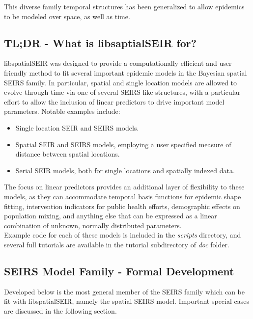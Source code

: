 \documentclass[12pt]{article}
\begin{document}
This diverse family temporal structures has been generalized to allow epidemics to be modeled over space, as well as time.  

\subsection{TL;DR - What is libsaptialSEIR for?}

libspatialSEIR was designed to provide a computationally efficient and user friendly method to fit several important epidemic 
models in the Bayesian spatial SEIRS family. In particular, spatial and single location models are allowed to evolve through 
time via one of several SEIRS-like structures, with a particular effort to allow the inclusion of linear predictors to drive
important model parameters. Notable examples include:

\begin{itemize}
    \item Single location SEIR and SEIRS models.   
    \item Spatial SEIR and SEIRS models, employing a user specified measure of distance between spatial locations. 
    \item Serial SEIR models, both for single locations and spatially indexed data. 
\end{itemize}

The focus on linear predictors provides an additional layer of flexibility to these models, as they can accommodate 
temporal basis functions for epidemic shape fitting, intervention indicators for public health efforts, demographic 
effects on population mixing, and anything else that can be expressed as a linear combination of unknown, normally
distributed parameters.\\ 


Example code for each of these models is included in the \textit{scripts} directory, and several full tutorials are available in the 
tutorial subdirectory of \textit{doc} folder. 

\subsection{SEIRS Model Family - Formal Development}
        Developed below is the most general member of the SEIRS family which can be fit with libspatialSEIR, 
        namely the spatial SEIRS model. Important special cases are discussed in the following section.
\end{document}
